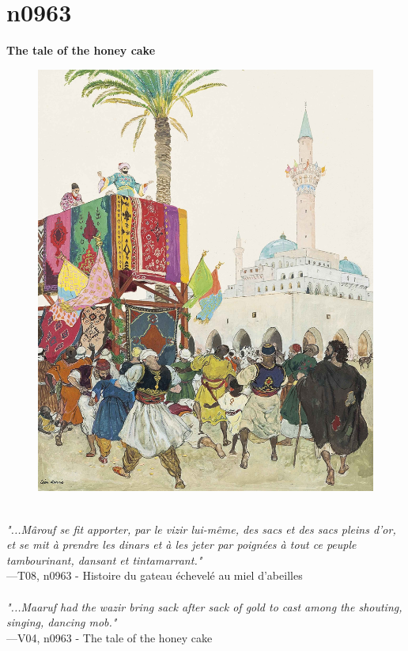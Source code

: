 \documentclass[../Carre_nights.tex]{subfiles}
\begin{document}
\newpage

\section{n0963}
\textbf{\Large{The tale of the honey cake}} \\

\begin{figure}[ht]
\centering
\includegraphics[height=\figsize]{illustrations/volume_8/T08, n0963 - Histoire du gateau échevelé au miel d'abeilles.jpg}
\end{figure}

\textit{\\
"...Mârouf se fit apporter, par le vizir lui-même, des sacs et des sacs pleins d’or, et se mit à prendre les dinars et à les jeter par poignées à tout ce peuple tambourinant, dansant et tintamarrant."} \\
—T08, n0963 - Histoire du gateau échevelé au miel d'abeilles \\~\\
\textit{"...Maaruf had the wazir bring sack after sack of gold to cast among the shouting, singing, dancing mob."} \\
—V04, n0963 - The tale of the honey cake
\end{document}
